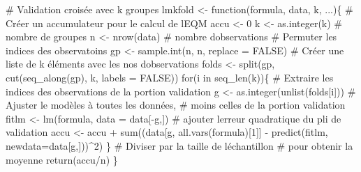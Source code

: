 \documentclass[
  11pt,
  letterpaper,
]{scrbook}
\newenvironment{Shaded}{\begin{snugshade}}{\end{snugshade}}
\newcommand{\AttributeTok}[1]{\textcolor[rgb]{0.40,0.45,0.13}{#1}}
\newcommand{\CommentTok}[1]{\textcolor[rgb]{0.37,0.37,0.37}{#1}}
\newcommand{\ConstantTok}[1]{\textcolor[rgb]{0.56,0.35,0.01}{#1}}
\newcommand{\ControlFlowTok}[1]{\textcolor[rgb]{0.00,0.23,0.31}{#1}}
\newcommand{\DecValTok}[1]{\textcolor[rgb]{0.68,0.00,0.00}{#1}}
\newcommand{\FunctionTok}[1]{\textcolor[rgb]{0.28,0.35,0.67}{#1}}
\newcommand{\NormalTok}[1]{\textcolor[rgb]{0.00,0.23,0.31}{#1}}
\newcommand{\OtherTok}[1]{\textcolor[rgb]{0.00,0.23,0.31}{#1}}
\newcommand{\SpecialCharTok}[1]{\textcolor[rgb]{0.37,0.37,0.37}{#1}}
\theoremstyle{definition}
\theoremstyle{remark}
\begin{document}
\begin{Shaded}
\begin{Highlighting}[]
\CommentTok{\# Validation croisée avec k groupes}
\NormalTok{lmkfold }\OtherTok{\textless{}{-}} \ControlFlowTok{function}\NormalTok{(formula, data, k, ...)\{}
   \CommentTok{\# Créer un accumulateur pour le calcul de l\textquotesingle{}EQM}
\NormalTok{   accu }\OtherTok{\textless{}{-}} \DecValTok{0}
\NormalTok{   k }\OtherTok{\textless{}{-}} \FunctionTok{as.integer}\NormalTok{(k) }\CommentTok{\# nombre de groupes}
\NormalTok{   n }\OtherTok{\textless{}{-}} \FunctionTok{nrow}\NormalTok{(data) }\CommentTok{\# nombre d\textquotesingle{}observations}
   \CommentTok{\# Permuter les indices des observatoins}
\NormalTok{   gp }\OtherTok{\textless{}{-}} \FunctionTok{sample.int}\NormalTok{(n, n, }\AttributeTok{replace =} \ConstantTok{FALSE}\NormalTok{)}
   \CommentTok{\# Créer une liste de k éléments avec les nos d\textquotesingle{}observations}
\NormalTok{   folds }\OtherTok{\textless{}{-}} \FunctionTok{split}\NormalTok{(gp, }\FunctionTok{cut}\NormalTok{(}\FunctionTok{seq\_along}\NormalTok{(gp), k, }\AttributeTok{labels =} \ConstantTok{FALSE}\NormalTok{))}
   \ControlFlowTok{for}\NormalTok{(i }\ControlFlowTok{in} \FunctionTok{seq\_len}\NormalTok{(k))\{}
      \CommentTok{\# Extraire les indices des observations de la portion validation}
\NormalTok{      g }\OtherTok{\textless{}{-}} \FunctionTok{as.integer}\NormalTok{(}\FunctionTok{unlist}\NormalTok{(folds[i]))}
      \CommentTok{\# Ajuster le modèles à toutes les données, }
      \CommentTok{\#  moins celles de la portion validation}
\NormalTok{      fitlm }\OtherTok{\textless{}{-}} \FunctionTok{lm}\NormalTok{(formula, }\AttributeTok{data =}\NormalTok{ data[}\SpecialCharTok{{-}}\NormalTok{g,])}
      \CommentTok{\# ajouter l\textquotesingle{}erreur quadratique du pli de validation}
\NormalTok{      accu }\OtherTok{\textless{}{-}}\NormalTok{ accu }\SpecialCharTok{+} 
          \FunctionTok{sum}\NormalTok{((data[g, }\FunctionTok{all.vars}\NormalTok{(formula)[}\DecValTok{1}\NormalTok{]] }\SpecialCharTok{{-}} 
                \FunctionTok{predict}\NormalTok{(fitlm, }\AttributeTok{newdata=}\NormalTok{data[g,]))}\SpecialCharTok{\^{}}\DecValTok{2}\NormalTok{)}
\NormalTok{   \}}
   \CommentTok{\# Diviser par la taille de l\textquotesingle{}échantillon }
   \CommentTok{\# pour obtenir la moyenne}
   \FunctionTok{return}\NormalTok{(accu}\SpecialCharTok{/}\NormalTok{n)}
\NormalTok{\}}


\end{Highlighting}
\end{Shaded}
\end{document}
